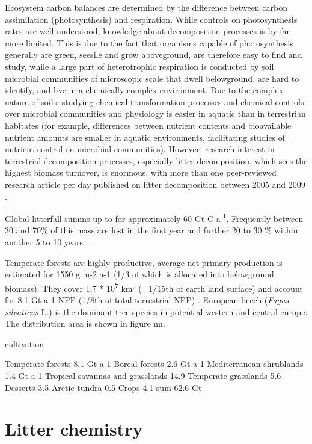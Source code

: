 Ecosystem carbon balances are determined by the difference between carbon assimilation (photosynthesis) and respiration. While controls on photosynthesis rates are well understood, knowledge about decomposition processes is by far more limited. This is due to the fact that organisms capable of photosynthesis generally are green, seesile and grow aboveground, are therefore easy to find and study, while a large part of heterotrophic respiration is conducted by soil microbial communities of microscopic scale that dwell belowground, are  hard to identify, and live in a chemically complex environment. Due to the complex nature of soils, studying chemical transformation processes and chemical controls over microbial communities and physiology is easier in aquatic than in terrestrian habitates (for example, differences between nutrient contents and bioavailable nutrient amounts are smaller in aquatic environments, facilitating studies of nutrient control on microbial communities). However, research interest in terrestrial decomposition processes, especially litter decomposition, which sees the highest biomass turnover, is enormous, with more than one peer-reviewed research article per day published on litter decomposition between 2005 and 2009 \citep{Prescott2010}. 

Global litterfall summs up to for approximately 60 Gt C a\textsuperscript{-1}. Frequently between 30 and 70\% of this mass are lost in the first year and further 20 to 30 \% within another 5 to 10 years \citep[p.157]{Chapin2002}.

Temperate forests are highly productive, average net primary production is estimated for 1550 g m-2 a-1 (1/3 of which is allocated into belowground biomass). They cover 1.7 * 10\textsuperscript{7} km² (~ 1/15th of earth land surface) and account for 8.1 Gt a-1 NPP (1/8th of total terrestrial NPP) \citep[p?]{Chapin2002}. European beech (\emph{Fagus silvaticus} L.) is the dominant tree species in potential western and central europe. The distribution area is shown in figure nn. 

cultivation


Temperate forests 8.1 Gt a-1
Boreal forests 2.6 Gt a-1
Mediterranean shrublands 1.4 Gt a-1
Tropical savannas and grasslands 14.9
Temperate grasslands 5.6
Desserts 3.5
Arctic tundra 0.5 
Crops 4.1
sum 62.6 Gt

\section{Litter chemistry}
